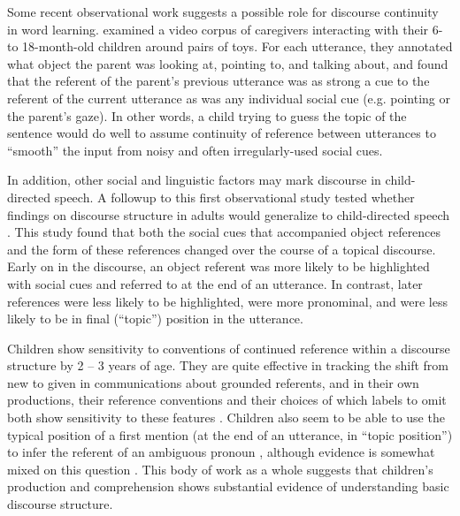 \documentclass[man]{apa2}
\begin{document}
Some recent observational work suggests a possible role for discourse continuity in word learning.  examined a video corpus of caregivers interacting with their 6- to 18-month-old children around pairs of toys. For each utterance, they annotated what object the parent was looking at, pointing to, and talking about, and found that the referent of the parent's previous utterance was as strong a cue to the referent of the current utterance as was any individual social cue (e.g. pointing or the parent's gaze). In other words, a child trying to guess the topic of the sentence would do well to assume continuity of reference between utterances to ``smooth'' the input from noisy and often irregularly-used social cues.

In addition, other social and linguistic factors may mark discourse in child-directed speech. A followup to this first observational study tested whether findings on discourse structure in adults would generalize to child-directed speech \cite{rohdeunderreview}. This study found that both the social cues that accompanied object references and the form of these references changed over the course of a topical discourse. Early on in the discourse, an object referent was more likely to be highlighted with social cues and referred to at the end of an utterance. In contrast, later references were less likely to be highlighted, were more pronominal, and were less likely to be in final (``topic'') position in the utterance. 

Children show sensitivity to conventions of continued reference within a discourse structure by 2 -- 3 years of age.  They are quite effective in tracking the shift from new to given in communications about grounded referents, and in their own productions, their reference conventions and their choices of which labels to omit both show sensitivity to these features \cite{allen2000, bates1976, greenfield1976, clancy2004, skarabela2007}.  Children also seem to be able to use the typical position of a first mention (at the end of an utterance, in ``topic position'') to infer the referent of an ambiguous pronoun \cite{song2005, song2007, pyykkonen2010}, although evidence is somewhat mixed on this question \cite{arnold2007}. This body of work as a whole suggests that children's production and comprehension shows substantial evidence of understanding basic discourse structure.
\end{document}
